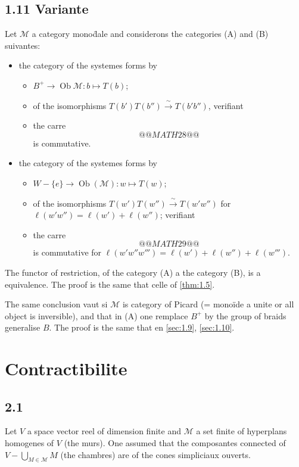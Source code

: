 \documentclass[11pt,a4paper]{article}
\theoremstyle{plain}
\theoremstyle{definition}
\DeclareMathOperator{\Ob}{Ob}
\newcommand{\cM}{\mathscr{M}}
\begin{document}
\subsection*{1.11 Variante}

Let $\cM$ a category mono\"dale and considerons the categories (A) and (B) suivantes:
\begin{itemize}
\item[(A)] the category of the systemes forms by
\begin{itemize}
\item[(A.1)] $B^+ \to \Ob\cM : b \mapsto T(b)$;
\item[(A.2)] of the isomorphisms $T(b')T(b'') \xrightarrow{\;\sim\;} T(b'b'')$, verifiant
\item[(A.3)] the carre
\[
@@MATH28@@
\]
is commutative.
\end{itemize}
\item[(B)] the category of the systemes forms by
\begin{itemize}
\item[(B.1)] $W - \{e\} \to \Ob(\cM) : w \mapsto T(w)$;
\item[(B.2)] of the isomorphisms $T(w')T(w'') \xrightarrow{\;\sim\;} T(w'w'')$ for $\ell(w'w'') = \ell(w') + \ell(w'')$; verifiant
\item[(B.3)] the carre
\[
@@MATH29@@
\]
is commutative for $\ell(w'w''w''') = \ell(w') + \ell(w'') + \ell(w''')$.
\end{itemize}
\end{itemize}
The functor of restriction, of the category (A) a the category (B), is a equivalence. The proof is the same that celle of \ref{thm:1.5}.

The same conclusion vaut si $\cM$ is category of Picard (= mono\"ide a unite or all object is inversible), and that in (A) one remplace $B^+$ by the group of braids generalise $B$. The proof is the same that en \ref{sec:1.9}, \ref{sec:1.10}.

\section{Contractibilite}\label{sec:contractibilite}

\subsection*{2.1}

Let $V$ a space vector reel of dimension finite and $\cM$ a set finite of hyperplans homogenes of $V$ (the murs). One assumed that the composantes connected of $V - \bigcup_{M \in \cM} M$ (the chambres) are of the cones simpliciaux ouverts.
\end{document}
